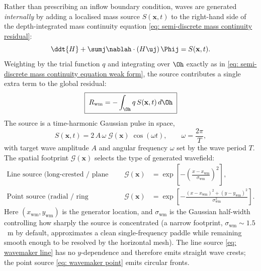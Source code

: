 Rather than prescribing an inflow boundary condition, waves are generated \emph{internally} by adding
a localised mass source $S(\mathbf{x},t)$ to the right-hand side of the depth-integrated mass
continuity equation \eqref{eq: semi-discrete mass continuity residual}:
\begin{equation}
    \ddt{H} + \sumj\nablah\cdot\left(H\uj\right)\Phij = S(\mathbf{x},t).
    \label{eq: continuity with source}
\end{equation}
Weighting by the trial function $q$ and integrating over $\Oh$ exactly as in
\eqref{eq: semi-discrete mass continuity equation weak form}, the source contributes a single extra
term to the global residual:
\begin{equation}
    \boxed{\; R_{\text{wm}} = -\int_{\Oh} q\, S(\mathbf{x},t)\, d\Oh \;}
    \label{eq: wavemaker residual contribution}
\end{equation}
The source is a time-harmonic Gaussian pulse in space,
\begin{equation}
    S(\mathbf{x},t) = 2\,A\,\omega\; \mathcal{G}(\mathbf{x})\;\cos(\omega t),
    \qquad \omega = \frac{2\pi}{T},
    \label{eq: wavemaker source profile}
\end{equation}
with target wave amplitude $A$ and angular frequency $\omega$ set by the wave period $T$. The spatial
footprint $\mathcal{G}(\mathbf{x})$ selects the type of generated wavefield:
\begin{subequations}\label{eq: wavemaker footprints}
    \begin{align}
        \text{Line source (long-crested / plane waves):} && \mathcal{G}(\mathbf{x}) &= \exp\!\left[-\left(\frac{x-x_{\text{wm}}}{\sigma_{\text{wm}}}\right)^{2}\right], \label{eq: wavemaker line}\\[1mm]
        \text{Point source (radial / ring waves):} && \mathcal{G}(\mathbf{x}) &= \exp\!\left[-\frac{(x-x_{\text{wm}})^{2}+(y-y_{\text{wm}})^{2}}{\sigma_{\text{wm}}^{2}}\right]. \label{eq: wavemaker point}
    \end{align}
\end{subequations}
Here $(x_{\text{wm}}, y_{\text{wm}})$ is the generator location, and $\sigma_{\text{wm}}$ is the
Gaussian half-width controlling how sharply the source is concentrated (a narrow footprint,
$\sigma_{\text{wm}}\sim1.5$~m by default, approximates a clean single-frequency paddle while
remaining smooth enough to be resolved by the horizontal mesh). The line source
\eqref{eq: wavemaker line} has no $y$-dependence and therefore emits straight wave crests; the point
source \eqref{eq: wavemaker point} emits circular fronts.

